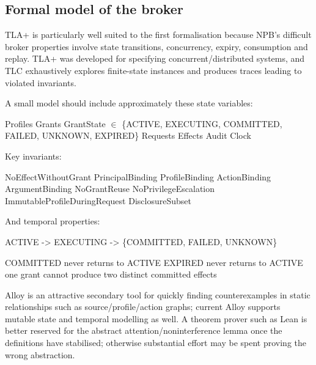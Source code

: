 \documentclass[11pt,a4paper]{article}
\begin{document}
\subsection*{Formal model of the broker}
TLA+ is particularly well suited to the first formalisation because NPB's difficult broker properties involve state transitions, concurrency, expiry, consumption and replay. TLA+ was developed for specifying concurrent/distributed systems, and TLC exhaustively explores finite-state instances and produces traces leading to violated invariants.\par
A small model should include approximately these state variables:\par
Profiles Grants GrantState  $\in$  \{ACTIVE, EXECUTING, COMMITTED, FAILED, UNKNOWN, EXPIRED\} Requests Effects Audit Clock\par
Key invariants:\par
NoEffectWithoutGrant PrincipalBinding ProfileBinding ActionBinding ArgumentBinding NoGrantReuse NoPrivilegeEscalation ImmutableProfileDuringRequest DisclosureSubset\par
And temporal properties:\par
ACTIVE -> EXECUTING -> \{COMMITTED, FAILED, UNKNOWN\}\par
COMMITTED never returns to ACTIVE EXPIRED never returns to ACTIVE one grant cannot produce two distinct committed effects\par
Alloy is an attractive secondary tool for quickly finding counterexamples in static relationships such as source/profile/action graphs; current Alloy supports mutable state and temporal modelling as well. A theorem prover such as Lean is better reserved for the abstract attention/noninterference lemma once the definitions have stabilised; otherwise substantial effort may be spent proving the wrong abstraction.\par
\end{document}

